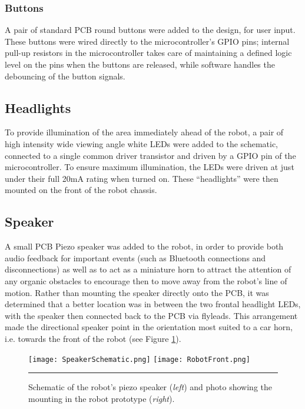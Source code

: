 \FloatBarrier
\subsubsection{Buttons}

A pair of standard PCB round buttons were added to the design, for user input. These buttons were wired directly to the microcontroller's GPIO pins; internal pull-up resistors in the microcontroller takes care of maintaining a defined logic level on the pins when the buttons are released, while software handles the debouncing of the button signals.

\FloatBarrier
\subsection{Headlights}

To provide illumination of the area immediately ahead of the robot, a pair of high intensity wide viewing angle white LEDs were added to the schematic, connected to a single common driver transistor and driven by a GPIO pin of the microcontroller. To ensure maximum illumination, the LEDs were driven at just under their full 20mA rating when turned on. These ``headlights'' were then mounted on the front of the robot chassis.

\FloatBarrier
\subsection{Speaker}

A small PCB Piezo speaker was added to the robot, in order to provide both audio feedback for important events (such as Bluetooth connections and disconnections) as well as to act as a miniature horn to attract the attention of any organic obstacles to encourage then to move away from the robot's line of motion. Rather than mounting the speaker directly onto the PCB, it was determined that a better location was in between the two frontal headlight LEDs, with the speaker then connected back to the PCB via flyleads. This arrangement made the directional speaker point in the orientation most suited to a car horn, i.e. towards the front of the robot (see Figure \ref{fig:robotspeaker}).

\begin{figure}[tbph]
	\centering
		\texttt{[image: SpeakerSchematic.png]}
		\texttt{[image: RobotFront.png]}
	\rule{35em}{0.5pt}
	\caption[Speaker Schematic and Mounting Photo]{Schematic of the robot's piezo speaker (\textit{left}) and photo showing the mounting in the robot prototype (\textit{right}).}
	\label{fig:robotspeaker}
\end{figure}


